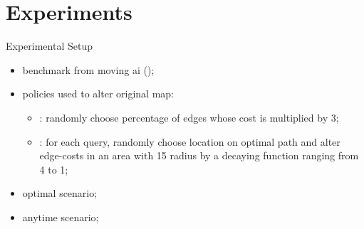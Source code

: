 \section*{Experiments}

\begin{frame}{Experimental Setup}
    
    \begin{itemize}
        \item benchmark from moving ai ();
        \item policies used to alter original map:
            \begin{itemize}
                \item {}: randomly choose percentage of edges whose cost is multiplied by 3;
                \item {}: for each query, randomly choose location on optimal path and alter edge-costs in an area with 15 radius by a decaying function ranging from 4 to 1;
            \end{itemize}
        \item optimal scenario;
        \item anytime scenario;
    \end{itemize}
\end{frame}

